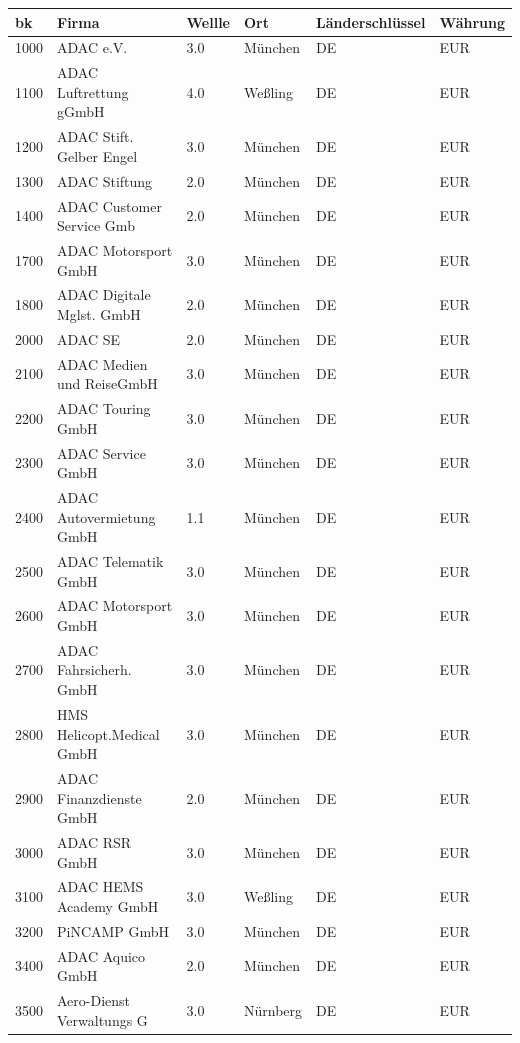 \begin{table}
\begin{tabularx}{\textwidth}{|l|l|l|l|l|l|}\rowcolor[HTML]{9B9B9B}
\textbf{\gls{bk}} & \textbf{Firma} & \textbf{Wellle} & \textbf{Ort} & \textbf{Länderschlüssel} & \textbf{Währung} \\ \hline
1000 & ADAC e.V. & 3.0 & München & DE & EUR \\ \hline
1100 & ADAC Luftrettung gGmbH & 4.0 & Weßling & DE & EUR \\ \hline
1200 & ADAC Stift. Gelber Engel & 3.0 & München & DE & EUR \\ \hline
1300 & ADAC Stiftung & 2.0 & München & DE & EUR \\ \hline
1400 & ADAC Customer Service Gmb & 2.0 & München & DE & EUR \\ \hline
1700 & ADAC Motorsport GmbH & 3.0 & München & DE & EUR \\ \hline
1800 & ADAC Digitale Mglst. GmbH & 2.0 & München & DE & EUR \\ \hline
2000 & ADAC SE & 2.0 & München & DE & EUR \\ \hline 
2100 & ADAC Medien und ReiseGmbH & 3.0 & München & DE & EUR \\ \hline
2200 & ADAC Touring GmbH & 3.0 & München & DE & EUR \\ \hline
2300 & ADAC Service GmbH & 3.0 & München & DE & EUR \\ \hline
2400 & ADAC Autovermietung GmbH & 1.1 & München & DE & EUR \\ \hline
2500 & ADAC Telematik GmbH & 3.0 & München & DE & EUR \\ \hline
2600 & ADAC Motorsport GmbH & 3.0 & München & DE & EUR \\ \hline
2700 & ADAC Fahrsicherh. GmbH & 3.0 & München & DE & EUR \\ \hline
2800 & HMS Helicopt.Medical GmbH & 3.0 & München & DE & EUR \\ \hline
2900 & ADAC Finanzdienste GmbH & 2.0 & München & DE & EUR \\ \hline
3000 & ADAC RSR GmbH & 3.0 & München & DE & EUR \\ \hline
3100 & ADAC HEMS Academy GmbH & 3.0 & Weßling & DE & EUR \\ \hline
3200 & PiNCAMP GmbH & 3.0 & München & DE & EUR \\ \hline
3400 & ADAC Aquico GmbH & 2.0 & München & DE & EUR \\ \hline
3500 & Aero-Dienst Verwaltungs G & 3.0 & Nürnberg & DE & EUR \\ \hline

\end{tabularx}
\end{table}
